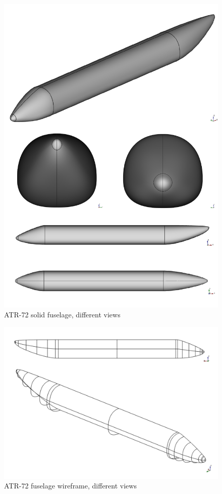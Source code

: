 \bigskip
%
\begin{figure}[H]
\centering
\includegraphics[scale=0.45]{Immagini/Capitolo3/fussolid_1}
\caption{ATR-72 solid fuselage, different views}
\label{fig:FusSolid}
\end{figure}
%
\begin{figure}[H]
\centering
\includegraphics[scale=0.32]{Immagini/Capitolo3/fuswireframe_1}
\caption{ATR-72 fuselage wireframe, different views}
\label{fig:FusWireframe}
\end{figure}

